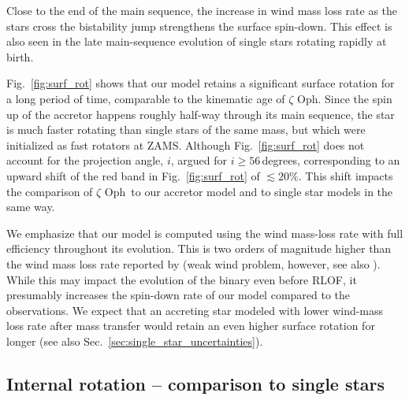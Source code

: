 \documentclass[twocolumn,twocolappendix,trackchanges]{aastex63}
\DeclareRobustCommand{\Figref}[1]{Fig.~\ref{#1}}
\DeclareRobustCommand{\Secref}[1]{Sec.~\ref{#1}}
\newcommand{\zoph}{$\zeta$ Oph}
\begin{document}
Close to the end of the main sequence, the increase in wind mass loss
rate as the stars cross the bistability jump \citep[due to iron recombination
at $T_\mathrm{eff}\simeq25\,000\,\mathrm{K}$, e.g.,][]{vink:00}
strengthens the surface spin-down. This effect is also seen in the
late main-sequence evolution of single stars rotating rapidly at
birth.

\Figref{fig:surf_rot} shows that our model retains a significant
surface rotation for a long period of time, comparable to the
kinematic age of \zoph. Since the spin up of the accretor happens
roughly half-way through its main sequence, the star is much faster
rotating than single stars of the same mass, but which were initialized as
fast rotators at ZAMS. Although \Figref{fig:surf_rot} does not account
for the projection angle, $i$, \cite{zehe:18} argued for
$i\geq56$\,degrees, corresponding to an upward shift of the red band
in \Figref{fig:surf_rot} of $\lesssim 20\%$. This shift impacts the
comparison of \zoph\ to our accretor model and to single star models
in the same way.

We emphasize that our model is computed using the \cite{vink:00,
  vink:01} wind mass-loss rate with full efficiency throughout its
evolution. This is two orders of magnitude higher than the wind mass
loss rate reported by \cite{marcolino:09} (weak wind problem,
however, see also \citealt{lucy:12, lagae:21}). While this may impact
the evolution of the binary even before RLOF, it presumably increases the
spin-down rate of our model compared to the observations. We expect
that an accreting star modeled with lower wind-mass loss rate
after mass transfer would retain an even higher surface rotation for longer (see
also \Secref{sec:single_star_uncertainties}).


\subsection{Internal rotation -- comparison to  single stars}
\label{sec:rot_comparison_single}
\end{document}
